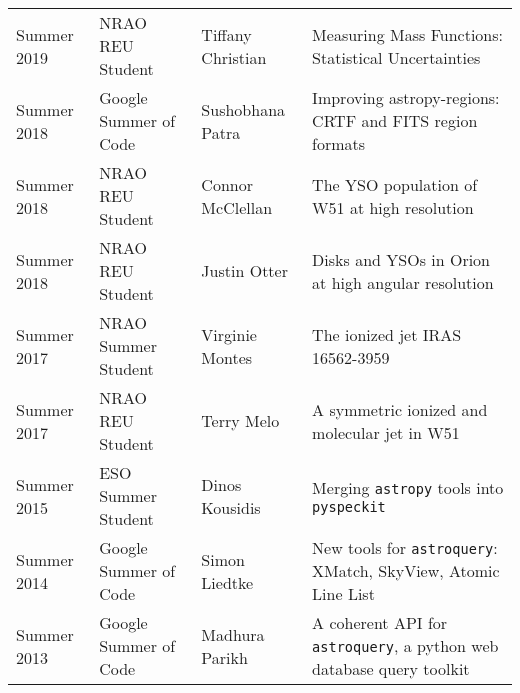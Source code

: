 \begin{minipage}{\textwidth}
\begin{tabular}{p{0.85in}p{1.3in}lp{2.6in}}
    Summer 2019 & NRAO REU Student &                                              Tiffany Christian    &  Measuring Mass Functions: Statistical Uncertainties \\
    Summer 2018 & Google Summer of Code &                                         Sushobhana Patra    &  Improving astropy-regions: CRTF and FITS region formats \\
    Summer 2018 & NRAO REU Student &                                              Connor McClellan    &  The YSO population of W51 at high resolution \\
    Summer 2018 & NRAO REU Student &                                              Justin Otter    &  Disks and YSOs in Orion at high angular resolution \\
    Summer 2017 & NRAO Summer Student &                                              Virginie Montes    &  The ionized jet IRAS 16562-3959 \\
    Summer 2017 & NRAO REU Student &                                                 Terry Melo    &  A symmetric ionized and molecular jet in W51 \\
    Summer 2015 & ESO Summer Student &                                                 Dinos Kousidis    &  Merging \texttt{astropy} tools into \texttt{pyspeckit} \\
    Summer 2014 & Google Summer of Code &                                                 Simon Liedtke    &  New tools for \texttt{astroquery}: XMatch, SkyView, Atomic Line List \\
    Summer 2013 & Google Summer of Code &                                                 Madhura Parikh   &  A coherent API for \texttt{astroquery}, a python web database query toolkit \\
\end{tabular}
\end{minipage}

\vspace{4mm}
